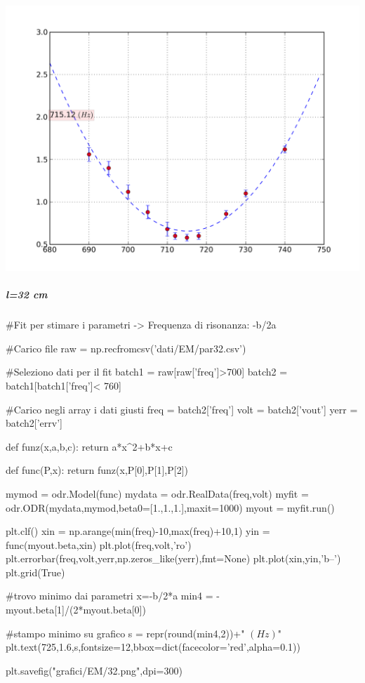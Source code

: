 \includegraphics[scale=0.75]{grafici/EM/34.png}

\subparagraph*{l=32 cm}

\begin{sagesilent}
 #Fit per stimare i parametri -> Frequenza di risonanza: -b/2a

#Carico file
raw = np.recfromcsv('dati/EM/par32.csv')

#Seleziono dati per il fit
batch1 = raw[raw['freq']>700]
batch2 = batch1[batch1['freq']< 760]

#Carico negli array i dati giusti
freq = batch2['freq']
volt = batch2['vout']
yerr = batch2['errv']


def funz(x,a,b,c):
    return a*x^2+b*x+c

def func(P,x):
    return funz(x,P[0],P[1],P[2])

mymod = odr.Model(func)
mydata = odr.RealData(freq,volt)
myfit = odr.ODR(mydata,mymod,beta0=[1.,1.,1.],maxit=1000)
myout = myfit.run()

plt.clf()
xin = np.arange(min(freq)-10,max(freq)+10,1)
yin = func(myout.beta,xin)
plt.plot(freq,volt,'ro')
plt.errorbar(freq,volt,yerr,np.zeros_like(yerr),fmt=None)
plt.plot(xin,yin,'b--')
plt.grid(True)

#trovo minimo dai parametri x=-b/2*a
min4 = -myout.beta[1]/(2*myout.beta[0]) 

#stampo minimo su grafico
s = repr(round(min4,2))+" $(Hz)$"
plt.text(725,1.6,s,fontsize=12,bbox=dict(facecolor='red',alpha=0.1))

plt.savefig("grafici/EM/32.png",dpi=300)
\end{sagesilent}

